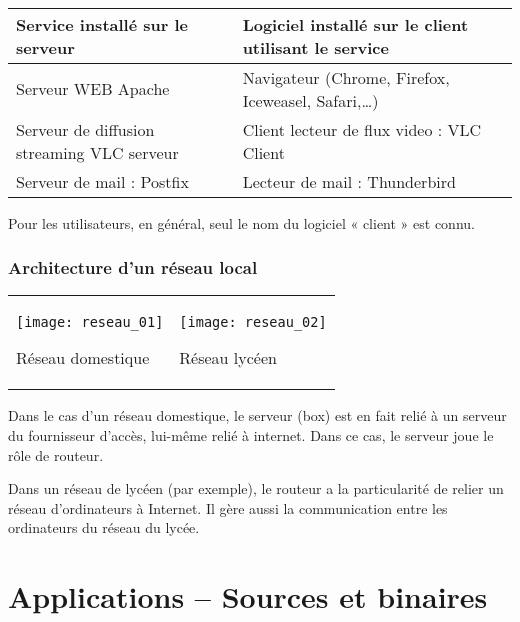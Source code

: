 \begin{exemple}~\\


\begin{center}
\begin{tabular}{|l|l|}
\hline
Service installé sur le serveur	& Logiciel installé sur le client utilisant le service \\ \hline
Serveur WEB Apache	&Navigateur (Chrome, Firefox, Iceweasel, Safari,…) \\ \hline
Serveur de diffusion streaming VLC serveur	& Client lecteur de flux video : VLC Client\\ \hline
Serveur de mail : Postfix	&Lecteur de mail : Thunderbird\\ \hline
\end{tabular}
\end{center}
\end{exemple}

Pour les utilisateurs, en général, seul le nom du logiciel « client » est connu.

\subsubsection{Architecture d’un réseau local}
 	 
\begin{center}
\begin{tabular}{p{}p{}}
\begin{center}
\texttt{[image: reseau\_01]}

Réseau domestique
\end{center} &
\begin{center}
\texttt{[image: reseau\_02]}

Réseau lycéen
\end{center}
\end{tabular}
\end{center}


Dans le cas d’un réseau domestique, le serveur (box) est en fait relié à un serveur du fournisseur d’accès, lui-même relié à internet. Dans ce cas, le serveur joue le rôle de routeur. 

Dans un réseau de lycéen (par exemple), le routeur a la particularité de relier un réseau d’ordinateurs à Internet. Il gère aussi la communication entre les ordinateurs du réseau du lycée.

\section{Applications -- Sources et binaires}
